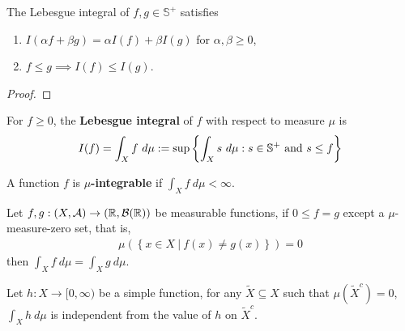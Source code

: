 \documentclass[11pt]{article}
\begin{document}
	\begin{theorem}
		The Lebesgue integral of $f, g \in \mathbb{S}^+$ satisfies
		\begin{enumerate}
			\item $I(\alpha f + \beta g) = \alpha I(f) + \beta I(g)$ for $\alpha, \beta \geq 0$,
			\item $f \leq g \implies I(f) \leq I(g)$.
		\end{enumerate}
	\end{theorem}
	
	\begin{proof}
		
	\end{proof}
	
	\begin{definition}
		For $f \geq 0$, the \textbf{Lebesgue integral} of $f$ with respect to measure $\mu$ is
		\begin{align}
			I(f) = \int_X f\ d\mu := \sup\left\{\int_X s\ d\mu: s \in \mathbb{S}^+ \text{{ and }} s \leq f \right\}
		\end{align}
	\end{definition}
	
	\begin{definition}
		A function $f$ is \textbf{$\mu$-integrable} if $\int_X f\ d\mu < \infty$.
	\end{definition}
	
	\begin{theorem}\label{thm:1}
		Let $f, g: (X, \mathcal{{A}}) \to (\mathbb{R}, \mathcal{{B}}(\mathbb{R}))$ be measurable functions, if $0 \leq f = g$ except a $\mu$-measure-zero set, that is,
		\begin{align}
			\mu\left(\left\{
				x \in X\ |\ f(x) \neq g(x)
			\right\}\right) = 0
		\end{align}
		then $\int_X f\ d\mu = \int_X g\ d\mu$.
	\end{theorem}
	
	\begin{lemma}\label{lem:1}
		Let $h: X \to [0, \infty)$ be a simple function, for any $\tilde{X} \subseteq X$ such that $\mu(\tilde{X}^c) = 0$, $\int_X h\ d\mu$ is independent from the value of $h$ on $\tilde{X}^c$.
	\end{lemma}
	
\end{document}
